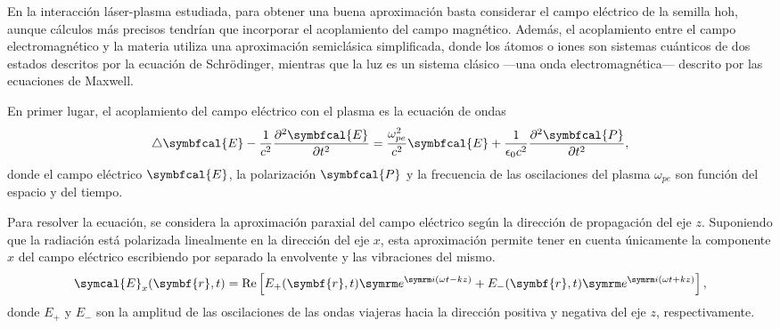 En la interacción láser-plasma estudiada, para obtener una buena aproximación basta considerar el campo eléctrico de la semilla \acrshort{hoh}, aunque cálculos más precisos tendrían que incorporar el acoplamiento del campo magnético. Además, el acoplamiento entre el campo electromagnético y la materia utiliza una aproximación semiclásica simplificada, donde los átomos o iones son sistemas cuánticos de dos estados descritos por la ecuación de Schrödinger, mientras que la luz es un sistema clásico ---una onda electromagnética--- descrito por las ecuaciones de Maxwell.

En primer lugar, el acoplamiento del campo eléctrico con el plasma es la ecuación de ondas 
\begin{equation}\label{eq:3.1}
    \laplacian{\symbfcal{E}} - \frac{1}{c^2}\frac{\partial^2 {\symbfcal{E}}}{\partial t^2} = 
    \frac{\omega_{pe}^2}{c^2}{\symbfcal{E}} + \frac{1}{\epsilon_0 c^2}\frac{\partial^2 {\symbfcal{P}}}{\partial t^2},
\end{equation}
\noindent
donde el campo eléctrico ${\symbfcal{E}}$, la polarización ${\symbfcal{P}}$ y la frecuencia de las oscilaciones del plasma $\omega_{pe}$ son función del espacio y del tiempo.

Para resolver la ecuación, se considera la aproximación paraxial del campo eléctrico según la dirección de propagación del eje $z$. Suponiendo que la radiación está polarizada linealmente en la dirección del eje $x$, esta aproximación permite tener en cuenta únicamente la componente $x$ del campo eléctrico escribiendo por separado la envolvente y las vibraciones del mismo.
\begin{equation}\label{eq:3.2}
    \symcal{E}_x(\symbf{r},t) 
    =
    \RE\left[E_+(\symbf{r},t)\eu^{\iu(\omega t - kz)}+E_-(\symbf{r},t)\eu^{\iu(\omega t + kz)}\right],
\end{equation}
\noindent
donde $E_+$ y $E_-$ son la amplitud de las oscilaciones de las ondas viajeras hacia la dirección positiva y negativa del eje $z$, respectivamente. 

